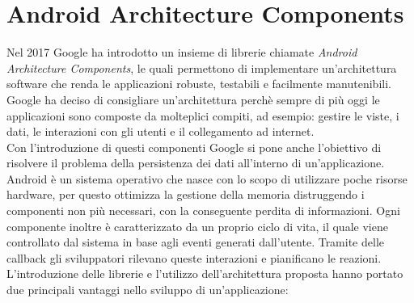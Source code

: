 \documentclass[12pt]{report}
\begin{document}
\section{Android Architecture Components}
Nel 2017 Google ha introdotto un insieme di librerie chiamate \textit{Android Architecture Components}, le quali permettono di implementare un'architettura software che renda le applicazioni robuste, testabili e facilmente manutenibili. %
Google ha deciso di consigliare un'architettura perchè sempre di più oggi le applicazioni sono composte da molteplici compiti, ad esempio: gestire le viste, i dati, le interazioni con gli utenti e il collegamento ad internet.\\

Con l'introduzione di questi componenti Google si pone anche l'obiettivo di risolvere il problema della persistenza dei dati all'interno di un'applicazione.\\
Android è un sistema operativo che nasce con lo scopo di utilizzare poche risorse hardware, per questo ottimizza la gestione della memoria distruggendo i componenti non più necessari, con la conseguente perdita di informazioni. Ogni componente inoltre è caratterizzato da un proprio ciclo di vita, il quale viene controllato dal sistema in base agli eventi generati dall'utente. Tramite delle callback gli sviluppatori rilevano queste interazioni e pianificano le reazioni. L'introduzione delle librerie e l'utilizzo dell'architettura proposta hanno portato due principali vantaggi nello sviluppo di un'applicazione:
\end{document}
